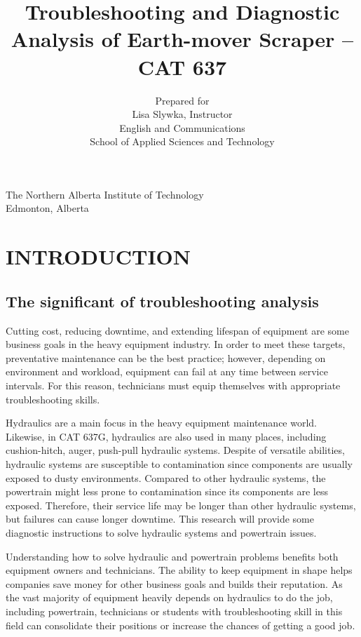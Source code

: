 \documentclass[a4paper,man,natbib]{apa6}
\title{Troubleshooting and Diagnostic Analysis of Earth-mover Scraper -- CAT 637}
\author{
Prepared for

Lisa Slywka, Instructor

English and Communications

School of Applied Sciences and Technology
}
\affiliation{
Prepared by

Tai Tran, 200222333

Industrial Heavy Equipment Technician Program

School of Applied Trades

October 31, 2016
}
\begin{document}
\centering The Northern Alberta Institute of Technology\\ Edmonton, Alberta

\maketitle

\tableofcontents
\newpage

\listoffigures
\newpage

\listoftables
\newpage



\section{INTRODUCTION}

\subsection{The significant of troubleshooting analysis}

Cutting cost, reducing downtime, and extending lifespan of equipment are some business goals in the heavy equipment industry. In order to meet these targets, preventative maintenance can be the best practice; however, depending on environment and workload, equipment can fail at any time between service intervals. For this reason, technicians must equip themselves with appropriate troubleshooting skills.

Hydraulics are a main focus in the heavy equipment maintenance world. Likewise, in CAT 637G, hydraulics are also used in many places, including cushion-hitch, auger, push-pull hydraulic systems. Despite of versatile abilities, hydraulic systems are susceptible to contamination since components are usually exposed to dusty environments. Compared to other hydraulic systems, the powertrain might less prone to contamination since its components are less exposed. Therefore, their service life may be longer than other hydraulic systems, but failures can cause longer downtime. This research will provide some diagnostic instructions to solve hydraulic systems and powertrain issues.

Understanding how to solve hydraulic and powertrain problems benefits both equipment owners and technicians. The ability to keep equipment in shape helps companies save money for other business goals and builds their reputation. As the vast majority of equipment heavily depends on hydraulics to do the job, including powertrain, technicians or students with troubleshooting skill in this field can consolidate their positions or increase the chances of getting a good job.
\end{document}
